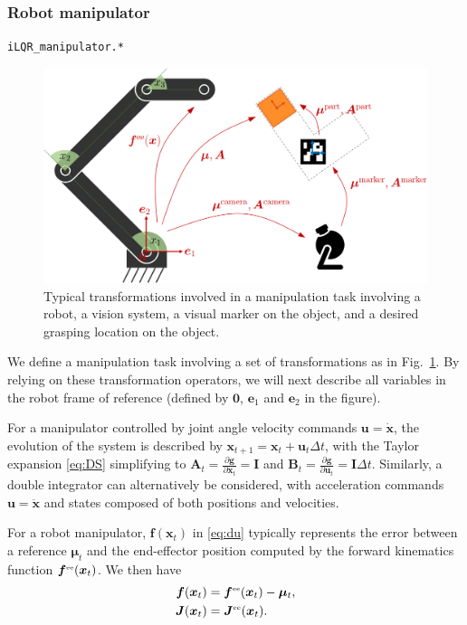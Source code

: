 \documentclass[10pt,a4paper]{article} %
\newcommand{\tp}[1]{\text{\tiny#1}}
\newcommand{\filename}[1]{\colorbox{rr2}{\color{white}\texttt{#1}}}
\begin{document}
\subsubsection{Robot manipulator}
\begin{flushright}
\filename{iLQR\_manipulator.*}
\end{flushright}

\begin{figure}
\centering
\includegraphics[width=.7\columnwidth]{images/transformations01.jpg}
\caption{\footnotesize
Typical transformations involved in a manipulation task involving a robot, a vision system, a visual marker on the object, and a desired grasping location on the object.  
}
\label{fig:transformations}
\end{figure}

We define a manipulation task involving a set of transformations as in Fig.~\ref{fig:transformations}. By relying on these transformation operators, we will next describe all variables in the robot frame of reference (defined by $\bm{0}$, $\bm{e}_1$ and $\bm{e}_2$ in the figure). 

For a manipulator controlled by joint angle velocity commands $\bm{u}=\bm{\dot{x}}$, the evolution of the system is described by $\bm{x}_{t+1} = \bm{x}_t + \bm{u}_t \Delta t$, with the Taylor expansion \eqref{eq:DS} simplifying to $\bm{A}_t=\frac{\partial\bm{g}}{\partial\bm{x}_t}=\bm{I}$ and $\bm{B}_t=\frac{\partial\bm{g}}{\partial\bm{u}_t}=\bm{I}\Delta t$. Similarly, a double integrator can alternatively be considered, with acceleration commands $\bm{u}=\bm{\ddot{x}}$ and states composed of both positions and velocities.

For a robot manipulator, $\bm{f}(\bm{x}_t)$ in \eqref{eq:du} typically represents the error between a reference $\bm{\mu}_t$ and the end-effector position computed by the forward kinematics function $\bm{f}^\tp{ee}(\bm{x}_t)$. We then have
\begin{align*}
	\bm{f}(\bm{x}_t) &= \bm{f}^\tp{ee}(\bm{x}_t) - \bm{\mu}_t, \\
	\bm{J}(\bm{x}_t) &= \bm{J}^\tp{ee}(\bm{x}_t).
\end{align*}
\end{document}
